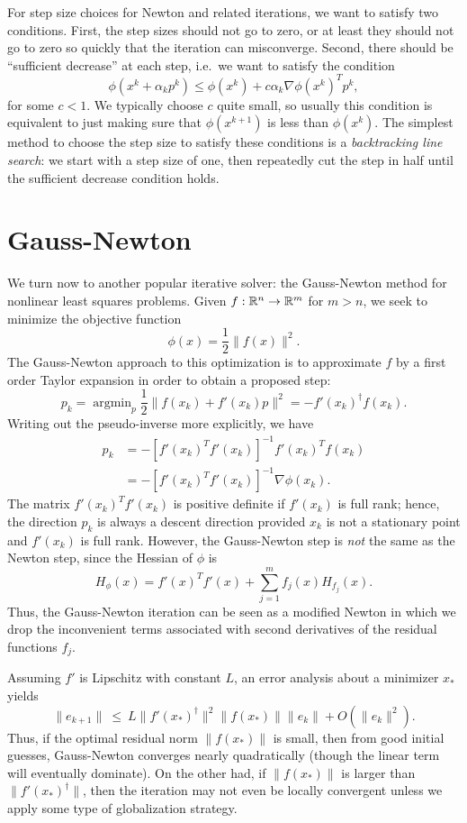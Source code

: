 \documentclass[12pt, leqno]{article} %
\begin{document}
For step size choices for Newton and related iterations, we want
to satisfy two conditions.  First, the step sizes should not go to
zero, or at least they should not go to zero so quickly that the
iteration can misconverge.  Second, there should be ``sufficient
decrease'' at each step, i.e.~we want to satisfy the condition
\[
  \phi(x^k + \alpha_k p^k) \leq \phi(x^k) + c \alpha_k \nabla
  \phi(x^k)^T p^k,
\]
for some $c < 1$.  We typically choose $c$ quite small, so usually
this condition is equivalent to just making sure that $\phi(x^{k+1})$
is less than $\phi(x^k)$.  The simplest method to choose the step
size to satisfy these conditions is a {\em backtracking line search}:
we start with a step size of one, then repeatedly cut the step in half
until the sufficient decrease condition holds.



\section{Gauss-Newton}

We turn now to another popular iterative solver: the Gauss-Newton
method for nonlinear least squares problems.  Given
$f : \mathbb{R}^n \rightarrow \mathbb{R}^m$ for $m > n$, we seek to minimize
the objective function
\[
  \phi(x) = \frac{1}{2} \|f(x)\|^2.
\]
The Gauss-Newton approach to this optimization is to approximate
$f$ by a first order Taylor expansion in order to obtain a proposed
step:
\[
  p_k
    = \operatorname{argmin}_p \frac{1}{2} \|f(x_k) + f'(x_k) p\|^2
    = -f'(x_k)^\dagger f(x_k).
\]
Writing out the pseudo-inverse more explicitly, we have
\begin{align*}
  p_k
  &= -[f'(x_k)^T f'(x_k)]^{-1} f'(x_k)^T f(x_k) \\
  &= -[f'(x_k)^T f'(x_k)]^{-1} \nabla \phi(x_k).
\end{align*}
The matrix $f'(x_k)^T f'(x_k)$ is positive definite if $f'(x_k)$ is
full rank; hence, the direction $p_k$ is always a descent direction
provided $x_k$ is not a stationary point and $f'(x_k)$ is full rank.
However, the Gauss-Newton step is {\em not} the same as the Newton
step, since the Hessian of $\phi$ is
\[
  H_{\phi}(x) = f'(x)^T f'(x) + \sum_{j=1}^m f_j(x) H_{f_j}(x).
\]
Thus, the Gauss-Newton iteration can be seen as a modified Newton
in which we drop the inconvenient terms associated with second
derivatives of the residual functions $f_j$.

Assuming $f'$ is Lipschitz with constant $L$, an error analysis about a
minimizer $x_*$ yields
\[
  \|e_{k+1}\| ~ \leq ~ L \|f'(x_*)^\dagger\|^2 \|f(x_*)\| \|e_k\| + O(\|e_k\|^2).
\]
Thus, if the optimal residual norm $\|f(x_*)\|$ is small, then from
good initial guesses, Gauss-Newton converges nearly quadratically
(though the linear term will eventually dominate).  On the other had,
if $\|f(x_*)\|$ is larger than $\|f'(x_*)^\dagger\|$, then the
iteration may not even be locally convergent unless we apply some type
of globalization strategy.
\end{document}
